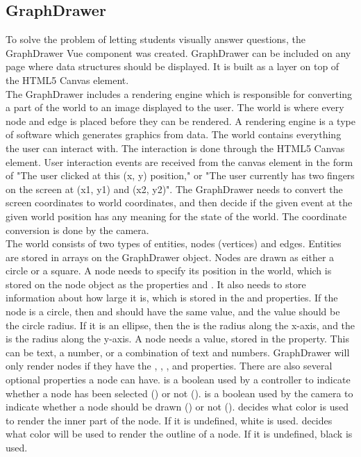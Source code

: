 \subsection{GraphDrawer}
To solve the problem of letting students visually answer questions, the GraphDrawer Vue component was created. GraphDrawer can be included on any page where data structures should be displayed. It is built as a layer on top of the HTML5 Canvas element.
\\[11pt]
The GraphDrawer includes a rendering engine which is responsible for converting a part of the world to an image displayed to the user. The world is where every node and edge is placed before they can be rendered. A rendering engine is a type of software which generates graphics from data. The world contains everything the user can interact with. The interaction is done through the HTML5 Canvas element. User interaction events are received from the canvas element in the form of "The user clicked at this (x, y) position," or "The user currently has two fingers on the screen at (x1, y1) and (x2, y2)". The GraphDrawer needs to convert the screen coordinates to world coordinates, and then decide if the given event at the given world position has any meaning for the state of the world. The coordinate conversion is done by the camera.
\\[11pt]
The world consists of two types of entities, nodes (vertices) and edges. Entities are stored in arrays on the GraphDrawer object. Nodes are drawn as either a circle or a square. A node needs to specify its position in the world, which is stored on the node object as the properties  and . It also needs to store information about how large it is, which is stored in the  and  properties. If the node is a circle, then  and  should have the same value, and the value should be the circle radius. If it is an ellipse, then the  is the radius along the x-axis, and the  is the radius along the y-axis. A node needs a value, stored in the  property. This can be text, a number, or a combination of text and numbers. GraphDrawer will only render nodes if they have the , , ,  and  properties. There are also several optional properties a node can have.  is a boolean used by a controller to indicate whether a node has been selected () or not ().  is a boolean used by the camera to indicate whether a node should be drawn () or not ().  decides what color is used to render the inner part of the node. If it is undefined, white is used.  decides what color will be used to render the outline of a node. If it is undefined, black is used.
